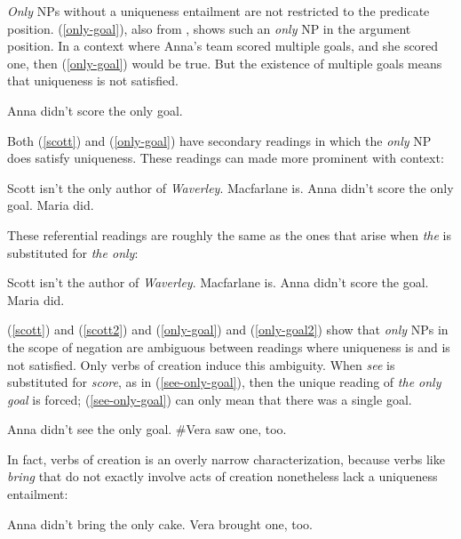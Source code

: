 \textit{Only} NPs without a uniqueness entailment are not restricted to the predicate position. (\ref{only-goal}), also from \citet{cb2015}, shows such an \textit{only} NP in the argument position. In a context where Anna's team scored multiple goals, and she scored one, then (\ref{only-goal}) would be true. But the existence of multiple goals means that uniqueness is not satisfied.

\begin{exe}
	\ex \label{only-goal} Anna didn't score the only goal.
\end{exe}

Both (\ref{scott}) and (\ref{only-goal}) have secondary readings in which the \textit{only} NP does satisfy uniqueness. These readings can made more prominent with context:

\begin{exe}
	\ex \label{scott2} Scott isn't the only author of \textit{Waverley}. Macfarlane is.
	\ex \label{only-goal2} Anna didn't score the only goal. Maria did.
\end{exe}

These referential readings are roughly the same as the ones that arise when \textit{the} is substituted for \textit{the only}:

\begin{exe}
	\ex Scott isn't the author of \textit{Waverley}. Macfarlane is.
	\ex Anna didn't score the goal. Maria did.
\end{exe}

(\ref{scott}) and (\ref{scott2}) and (\ref{only-goal}) and (\ref{only-goal2}) show that \textit{only} NPs in the scope of negation are ambiguous between readings where uniqueness is and is not satisfied. Only verbs of creation induce this ambiguity. When \textit{see} is substituted for \textit{score}, as in (\ref{see-only-goal}), then the unique reading of \textit{the only goal} is forced; (\ref{see-only-goal}) can only mean that there was a single goal.

\begin{exe}
	\ex \label{see-only-goal} Anna didn't see the only goal. \#Vera saw one, too.
\end{exe}

In fact, verbs of creation is an overly narrow characterization, because verbs like \textit{bring} that do not exactly involve acts of creation nonetheless lack a uniqueness entailment:

\begin{exe}
	\ex Anna didn't bring the only cake. Vera brought one, too.
\end{exe}

